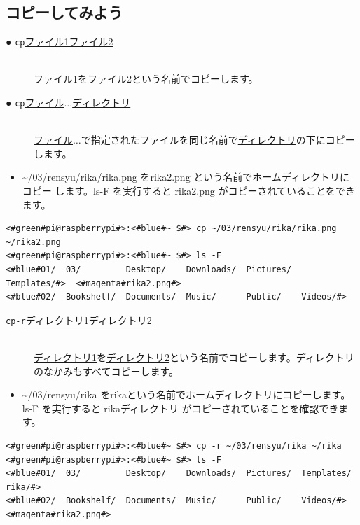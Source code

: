 \subsection{コピーしてみよう}
\begin{description}
    \item[● \texttt{cp}\textvisiblespace \underline{ファイル1}\textvisiblespace \underline{ファイル2}]\mbox{}\\
    ファイル1をファイル2という名前でコピーします。
    \item[● \texttt{cp}\textvisiblespace \underline{ファイル}$\ldots$\textvisiblespace \underline{ディレクトリ}]\mbox{}\\
    \underline{ファイル}$\ldots$で指定されたファイルを同じ名前で\underline{ディレクトリ}の下にコピーします。
\end{description}
\begin{itemize}
\item[<例>]\textasciitilde /03/rensyu/rika/rika.png をrika2.png という名前でホームディレクトリにコピー
します。ls\textvisiblespace -F を実行すると rika2.png がコピーされていることをできます。
\end{itemize}
\begin{lstlisting}[caption=cpの例, label=cp]
<#green#pi@raspberrypi#>:<#blue#~ $#> cp ~/03/rensyu/rika/rika.png ~/rika2.png
<#green#pi@raspberrypi#>:<#blue#~ $#> ls -F
<#blue#01/  03/         Desktop/    Downloads/  Pictures/  Templates/#>  <#magenta#rika2.png#>
<#blue#02/  Bookshelf/  Documents/  Music/      Public/    Videos/#>
\end{lstlisting}
\begin{description}
\item[\texttt{cp}\textvisiblespace \texttt{-r}\textvisiblespace \underline{ディレクトリ1}\textvisiblespace \underline{ディレクトリ2}]\mbox{}\\
\underline{ディレクトリ1}を\underline{ディレクトリ2}という名前でコピーします。ディレクトリのなかみもすべてコピーします。
\end{description}
\begin{itemize}
\item[<例>]\textasciitilde /03/rensyu/rika をrikaという名前でホームディレクトリにコピーします。ls\textvisiblespace -F を実行すると rikaディレクトリ がコピーされていることを確認できます。
\end{itemize}
\begin{lstlisting}[caption=cp -rの例, label=cp-R]
<#green#pi@raspberrypi#>:<#blue#~ $#> cp -r ~/03/rensyu/rika ~/rika
<#green#pi@raspberrypi#>:<#blue#~ $#> ls -F
<#blue#01/  03/         Desktop/    Downloads/  Pictures/  Templates/   rika/#>
<#blue#02/  Bookshelf/  Documents/  Music/      Public/    Videos/#>      <#magenta#rika2.png#>
\end{lstlisting}

